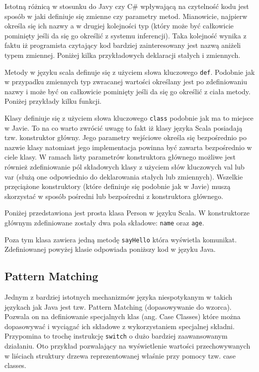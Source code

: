 \documentclass[brudnopis]{xmgr}
\begin{document}
Istotną różnicą w stosunku do Javy czy C\# wpływającą na czytelność kodu jest sposób w jaki definiuje się zmienne czy parametry metod. Mianowicie, najpierw określa się ich nazwy a w drugiej kolejności typ (który może być całkowicie pominięty jeśli da się go określić z systemu inferencji). Taka kolejność wynika z faktu iż programista czytający kod bardziej zainteresowany jest nazwą aniżeli typem zmiennej. Poniżej kilka przykładowych deklaracji stałych i zmiennych.



Metody w języku scala definuje się z użyciem słowa kluczowego \texttt{def}. Podobnie jak w przypadku zmiennych typ zwracanej wartości określany jest po zdefiniowaniu nazwy i może być on całkowicie pominięty jeśli da się go określić z ciała metody. Poniżej przykłady kilku funkcji.



Klasy definiuje się z użyciem słowa kluczowego \texttt{class} podobnie jak ma to miejsce w Javie. To na co warto zwrócić uwagę to fakt iż klasy języka Scala posiadają tzw. konstruktor główny. Jego parametry wejściowe określa się bezpośrednio po nazwie klasy natomiast jego implementacja powinna być zawarta bezpośrednio w ciele klasy. W ramach listy parametrów konstruktora głównego możliwe jest również zdefiniowanie pól składowych klasy z użyciem słów kluczowych val lub var (służą one odpowiednio do deklarowania stałych lub zmiennych). Wszelkie przęciążone konstruktory (które definiuje się podobnie jak w Javie) muszą skorzystać w sposób pośredni lub bezpośredni z konstruktora głównego.

Poniżej przedstawiona jest prosta klasa Person w języku Scala. W konstruktorze głównym zdefiniowane zostały dwa pola składowe: \texttt{name} oraz \texttt{age}.



Poza tym klasa zawiera jedną metodę \texttt{sayHello} która wyświetla komunikat.
Zdefiniowanej powyżej klasie odpowiada poniższy kod w języku Java.



\subsection{Pattern Matching}

Jednym z bardziej istotnych mechanizmów języka niespotykanym w takich językach jak Java jest tzw. Pattern Matching (dopasowywanie do wzorca). Pozwala on na definiowanie specjalnych klas (ang. Case Classes) które można dopasowywać i wyciągać ich składowe z wykorzystaniem specjalnej składni. Przypomina to trochę instrukcję \texttt{switch} o dużo bardziej zaawansowanym działaniu. Oto przykład pozwalający na wyświetlenie wartości przechowywanych w liściach struktury drzewa reprezentowanej właśnie przy pomocy tzw. case classes.
\end{document}
